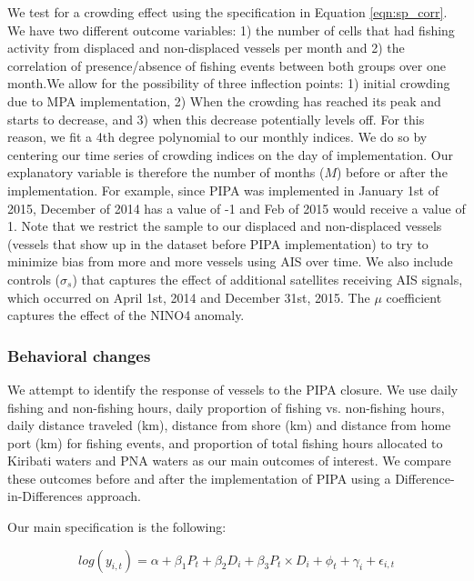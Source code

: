 \documentclass[12pt]{article}
\begin{document}
We test for a crowding effect using the specification in Equation \ref{eqn:sp_corr}. We have two different outcome variables:
1) the number of cells that had fishing activity from displaced and non-displaced vessels per month and 2) the correlation of presence/absence of fishing events between both groups over one month.We allow for the possibility of three inflection points: 1) initial crowding due to MPA implementation, 2) When the crowding has reached its peak and starts to decrease, and 3) when this decrease potentially levels off. For this reason, we fit a 4th degree polynomial to our monthly indices. We do so by centering our time series of crowding indices on the day of implementation. Our explanatory variable is therefore the number of months ($M$) before or after the implementation. For example, since PIPA was implemented in January 1st of 2015, December of 2014 has a value of -1 and Feb of 2015 would receive a value of 1. Note that we restrict the sample to our displaced and non-displaced vessels (vessels that show up in the dataset before PIPA implementation) to try to minimize bias from more and more vessels using AIS over time. We also include controls ($\sigma_s$) that captures the effect of additional satellites receiving AIS signals, which occurred on April 1st, 2014 and December 31st, 2015. The $\mu$ coefficient captures the effect of the NINO4 anomaly.

\subsubsection{Behavioral changes}

We attempt to identify the response of vessels to the PIPA closure. We use daily fishing and non-fishing hours, daily proportion of fishing vs. non-fishing hours, daily distance traveled (km), distance from shore (km) and distance from home port (km) for fishing events, and proportion of total fishing hours allocated to Kiribati waters and PNA waters as our main outcomes of interest. We compare these outcomes before and after the implementation of PIPA using a Difference-in-Differences approach.

Our main specification is the following:

$$
log(y_{i,t}) = \alpha + \beta_1 P_t + \beta_2 D_i + \beta_3 P_t \times D_i + \phi_t + \gamma_i + \epsilon_{i,t}
\label{eqn:did}
$$
\end{document}
